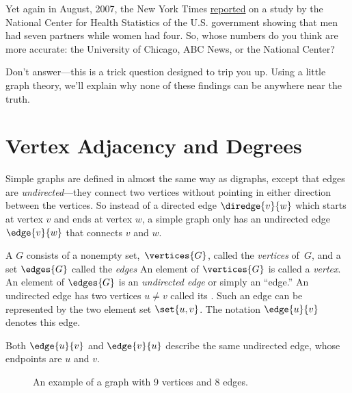 Yet again in August, 2007, the New York Times
\href{http://courses.csail.mit.edu/6.042/spring13/The-Myth-the-Math-the-Sex.pdf}{reported} \iffalse
\href{http://www.nytimes.com/2007/08/12/weekinreview/12kolata.html?_r=1&n=Top/Reference/Times\%20Topics/People/K/Kolata,\%20Gina&oref=slogin}{reported}
\fi on a study by the National Center for Health Statistics of the
U.S. government showing that men had seven partners while women had
four.  So, whose numbers do you think are more accurate: the
University of Chicago, ABC News, or the National Center?

Don't answer---this is a trick question designed to trip you up.
\iffalse like ``When did you stop beating your wife?''\fi Using a
little graph theory, we'll explain why none of these findings can be
anywhere near the truth.

\section{Vertex Adjacency and Degrees}\label{degreessec}

Simple graphs are defined in almost the same way as digraphs, except
that edges are \emph{undirected}---they connect two vertices without
pointing in either direction between the vertices.  So instead of a
directed edge $\diredge{v}{w}$ which starts at vertex $v$ and ends at
vertex $w$, a simple graph only has an undirected edge $\edge{v}{w}$
that connects $v$ and $w$.

\begin{definition}\label{simplegraphdef}
  A  $G$ consists of a nonempty
  set,~$\vertices{G}$, called the \emph{vertices}%
   of~$G$, and a set $\edges{G}$
  called the \emph{edges}%
  An element of $\vertices{G}$ is called a \emph{vertex}.  An element
  of $\edges{G}$ is an \emph{undirected edge} or simply an ``edge.''
  An undirected edge has two vertices $u\neq v$ called its
  .  Such an edge can be represented by the two
  element set $\set{u,v}$.  The notation $\edge{u}{v}$ denotes this
  edge.
\end{definition}
Both $\edge{u}{v}$ and $\edge{v}{u}$ describe the same undirected
edge, whose endpoints are $u$ and $v$.

\begin{figure}[h]
\caption{An example of a graph with 9 vertices and 8 edges.}
\label{fig:graph-example}
\end{figure}

